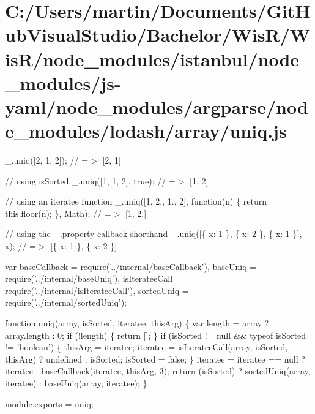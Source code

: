 \hypertarget{_c_1_2_users_2martin_2_documents_2_git_hub_visual_studio_2_bachelor_2_wis_r_2_wis_r_2node_module638be6c3affc7d0327e993b4deba116a}{}\section{C\+:/\+Users/martin/\+Documents/\+Git\+Hub\+Visual\+Studio/\+Bachelor/\+Wis\+R/\+Wis\+R/node\+\_\+modules/istanbul/node\+\_\+modules/js-\/yaml/node\+\_\+modules/argparse/node\+\_\+modules/lodash/array/uniq.\+js}
\+\_\+.\+uniq(\mbox{[}2, 1, 2\mbox{]}); // =$>$ \mbox{[}2, 1\mbox{]}

// using {\ttfamily is\+Sorted} \+\_\+.\+uniq(\mbox{[}1, 1, 2\mbox{]}, true); // =$>$ \mbox{[}1, 2\mbox{]}

// using an iteratee function \+\_\+.\+uniq(\mbox{[}1, 2., 1., 2\mbox{]}, function(n) \{ return this.\+floor(n); \}, Math); // =$>$ \mbox{[}1, 2.\mbox{]}

// using the {\ttfamily \+\_\+.\+property} callback shorthand \+\_\+.\+uniq(\mbox{[}\{ \textquotesingle{}x\textquotesingle{}\+: 1 \}, \{ \textquotesingle{}x\textquotesingle{}\+: 2 \}, \{ \textquotesingle{}x\textquotesingle{}\+: 1 \}\mbox{]}, \textquotesingle{}x\textquotesingle{}); // =$>$ \mbox{[}\{ \textquotesingle{}x\textquotesingle{}\+: 1 \}, \{ \textquotesingle{}x\textquotesingle{}\+: 2 \}\mbox{]}


\begin{DoxyCodeInclude}
var baseCallback = require(\textcolor{stringliteral}{'../internal/baseCallback'}),
    baseUniq = require(\textcolor{stringliteral}{'../internal/baseUniq'}),
    isIterateeCall = require(\textcolor{stringliteral}{'../internal/isIterateeCall'}),
    sortedUniq = require(\textcolor{stringliteral}{'../internal/sortedUniq'});

\textcolor{keyword}{function} uniq(array, isSorted, iteratee, thisArg) \{
  var length = array ? array.length : 0;
  \textcolor{keywordflow}{if} (!length) \{
    \textcolor{keywordflow}{return} [];
  \}
  \textcolor{keywordflow}{if} (isSorted != null && typeof isSorted != \textcolor{stringliteral}{'boolean'}) \{
    thisArg = iteratee;
    iteratee = isIterateeCall(array, isSorted, thisArg) ? undefined : isSorted;
    isSorted = \textcolor{keyword}{false};
  \}
  iteratee = iteratee == null ? iteratee : baseCallback(iteratee, thisArg, 3);
  \textcolor{keywordflow}{return} (isSorted)
    ? sortedUniq(array, iteratee)
    : baseUniq(array, iteratee);
\}

module.exports = uniq;
\end{DoxyCodeInclude}
 